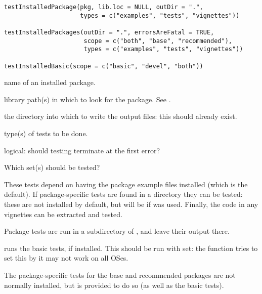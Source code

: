 %
\begin{Usage}
\begin{verbatim}
testInstalledPackage(pkg, lib.loc = NULL, outDir = ".",
                     types = c("examples", "tests", "vignettes"))

testInstalledPackages(outDir = ".", errorsAreFatal = TRUE,
                      scope = c("both", "base", "recommended"),
                      types = c("examples", "tests", "vignettes"))

testInstalledBasic(scope = c("basic", "devel", "both"))
\end{verbatim}
\end{Usage}
%
\begin{Arguments}
\begin{ldescription}
\item[\code{pkg}] name of an installed package.
\item[\code{lib.loc}] library path(s) in which to look for the package.  See
.
\item[\code{outDir}] the directory into which to write the output files: this
should already exist.
\item[\code{types}] type(s) of tests to be done.
\item[\code{errorsAreFatal}] logical: should testing terminate at the first
error?
\item[\code{scope}] Which set(s) should be tested?
\end{ldescription}
\end{Arguments}
%
\begin{Details}\relax
These tests depend on having the package example files installed (which
is the default).  If package-specific tests are found in a
 directory they can be tested: these are not
installed by default, but will be if
 was used.  Finally, the \R{}
code in any vignettes can be extracted and tested.

Package tests are run in a  subdirectory of
, and leave their output there.

 runs the basic tests, if installed.  This
should be run with  set: the function tries to set
this by it may not work on all OSes.

The package-specific tests for the base and recommended packages are
not normally installed, but  is provided
to do so (as well as the basic tests).
\end{Details}
